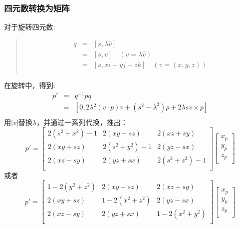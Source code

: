 \documentclass[a4paper,10pt]{article}
\begin{document}
\begin{CJK}{UTF8}{song}
\subsubsection{四元数转换为矩阵}
对于旋转四元数:
\begin{quote}
$$
\begin{array}{ccl}
q& = & [s,\lambda{}\hat{v}]  \\
 & = & [s,v]  \quad (v=\lambda\hat{v})\\
 & = & [s,xi+yj+zk] \quad (v=(x,y,z)) \\
\end{array}
$$
\end{quote}
在旋转中，得到:
\begin{displaymath}
\begin{array}{cll}
p' &  =  & q^{-1}pq  \\
   &  =  & [0,2\lambda{}^2(v\cdot{}p)v+(s^2-\lambda^2)p+2\lambda{}sv\times{}p] \\
\end{array}
\end{displaymath}
用$|v|$替换$\lambda$，并通过一系列代换，推出：
\begin{displaymath}
p'=\left[
\begin{array}{ccc}
2(s^2+x^2)-1 & 2(xy-sz) & 2(xz+sy)  \\
2(xy+sz)  &  2(s^2+y^2)-1 & 2(yz-sx) \\
2(xz-sy) & 2(yz+sx) & 2(s^2+z^2)-1 \\  
\end{array}\right]
\left[
\begin{array}{c}
x_p \\
y_p \\
z_p \\ 
\end{array}\right]
\end{displaymath}
或者
\begin{displaymath}
p'=\left[
\begin{array}{ccc}
1-2(y^2+z^2) & 2(xy-sz) & 2(xz+sy)  \\
2(xy+sz)  &  1-2(x^2+z^2) & 2(yz-sx) \\
2(xz-sy) & 2(yz+sx) & 1-2(x^2+y^2) \\  
\end{array}\right]
\left[
\begin{array}{c}
x_p \\
y_p \\
z_p \\ 
\end{array}\right]
\end{displaymath}

\end{CJK}
\end{document}
